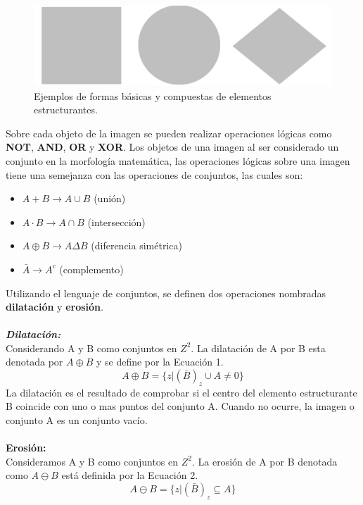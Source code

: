 \documentclass[conference]{IEEEtran}
\begin{document}
\begin{figure}[h]
	\begin{center}
		\setlength{\unitlength}{0.00105in}
		\includegraphics[scale=0.25]{./images/estruct_element.png}
	\end{center}
	\caption{Ejemplos de formas b\'asicas y compuestas de elementos estructurantes.}
\end{figure}

Sobre cada objeto de la imagen se pueden realizar operaciones l\'ogicas como \textbf{NOT}, \textbf{AND}, \textbf{OR} y \textbf{XOR}. Los objetos de una imagen al ser considerado un conjunto en la morfolog\'ia matem\'atica, las operaciones l\'ogicas sobre una imagen tiene una semejanza con las operaciones de conjuntos, las cuales son:

\begin{itemize}
	\item $A+B\rightarrow A\cup B$ (uni\'on)
	\item $A\cdot B \rightarrow A\cap B$ (intersecci\'on)
	\item $A\oplus B \rightarrow A\Delta B$ (diferencia sim\'etrica)
	\item $\bar{A} \rightarrow A^c$ (complemento)\\
\end{itemize}

Utilizando el lenguaje de conjuntos, se definen dos operaciones nombradas \textbf{dilataci\'on} y \textbf{erosi\'on}. \\\\
\textbf{\emph{Dilataci\'on: \\}}
Considerando A y B como conjuntos en $Z^2$. La dilataci\'on de A por B esta denotada por $A \oplus B$ y se define por la Ecuaci\'on 1.
\begin{equation}
	A \oplus B = \{z|(\bar{B})_z \cup A \neq 0 \}
\end{equation}
La dilataci\'on es el resultado de comprobar si el centro del elemento estructurante B coincide con uno o mas puntos del 
conjunto A. Cuando no ocurre, la imagen o conjunto A es un conjunto vac\'io.\\\\
\textbf{Erosi\'on: \\}
Consideramos A y B como conjuntos en $Z^2$. La erosi\'on de A por B denotada como $A \ominus B$ est\'a definida por la Ecuaci\'on 2.\\
\begin{equation}
	A \ominus B = \{z|(\bar{B})_z \subseteq A \}
\end{equation}
\end{document}

